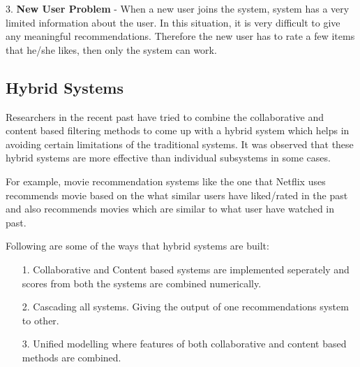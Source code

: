 3. {\bf New User Problem} - When a new user joins the system, system has a very limited information about the user. In this situation, it is very difficult to give any meaningful recommendations. Therefore the new user has to rate a few items that he/she likes, then only the system can work. 

\subsection{Hybrid Systems}
Researchers in the recent past have tried to combine the collaborative and content based filtering methods to come up with a hybrid system which helps in avoiding certain limitations of the traditional systems. It was observed that these hybrid systems are more effective than individual subsystems in some cases.

For example, movie recommendation systems like the one that Netflix uses recommends movie based on the what similar users have liked/rated in the past and also recommends movies which are similar to what user have watched in past.

Following are some of the ways that hybrid systems are built:
\begin{itemize}
\item[1.]Collaborative and Content based systems are implemented seperately and scores from both the systems are combined numerically.
\item[2.]Cascading all systems. Giving the output of one recommendations system to other.
\item[3.]Unified modelling where features of both collaborative and content based methods are combined. 
\end{itemize}
\newpage